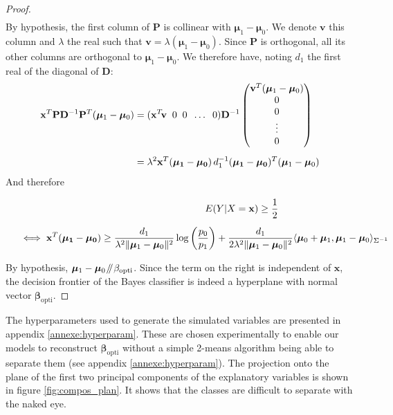 \documentclass[preprint,12pt]{elsarticle}
\newcommand{\parallelsum}{\mathbin{\!/\mkern-5mu/\!}}
\begin{document}
\begin{proof}
\begin{align}
\end{align}
By hypothesis, the first column of $\mathbf{P}$ is collinear with $\bm{\mu}_1 - \bm{\mu}_0$. We denote $\mathbf{v}$ this column and $\lambda$ the real such that $\mathbf{v} = \lambda (\bm{\mu}_1 - \bm{\mu}_0)$. Since $\mathbf{P}$ is orthogonal, all its other columns are orthogonal to $\bm{\mu}_1 - \bm{\mu}_0$. We therefore have, noting $d_1$ the first real of the diagonal of $\mathbf{D}$:
\begin{align}
    \mathbf{x}^T\mathbf{P}\mathbf{D}^{-1}\mathbf{P}^T(\bm{\mu}_1 - \bm{\mu}_0) &= (\mathbf{x}^T \hspace{-2 pt}\mathbf{v} \; \; 0 \; \; 0 \; \;\hdots \; \; 0) \mathbf{D}^{-1} \begin{pmatrix}
        \mathbf{v}^T(\bm{\mu}_1 - \bm{\mu}_0) \\
        0 \\
        0 \\
        \vdots \\
        0
        \end{pmatrix}\\[5 pt]
    &= \lambda^2\mathbf{x}^T (\mathbf{\bm{\mu}_1 - \bm{\mu}_0}) \, d_1^{-1} (\mathbf{\bm{\mu}_1 - \bm{\mu}_0})^T(\bm{\mu}_1 - \bm{\mu}_0)
\end{align}
And therefore

\begin{align}
    E(Y|X = \mathbf{x}) \geq \frac{1}{2} \hspace{2 cm} \phantom{2} & \\[5 pt]
    \iff  \mathbf{x}^T (\mathbf{\bm{\mu}_1 - \bm{\mu}_0})  \geq  \frac{d_1}{ \lambda^2\lVert\bm{\mu}_1 - \bm{\mu}_0 \rVert^2}\log\left(\frac{p_0}{p_1} \right) + \frac{d_1}{2 \lambda^2\lVert\bm{\mu}_1 - \bm{\mu}_0 \rVert^2}\langle \bm{\mu}_0 + \bm{\mu}_1 , \bm{\mu}_1 - \bm{\mu}_0\rangle_{\Sigma^{-1}} \hspace{-2 cm} \phantom{2} &\\[5 pt]
\end{align}
By hypothesis, $\bm{\mu}_1 - \bm{\mu}_0 \parallelsum \beta_{\text{opti}}$. Since the term on the right is independent of $\mathbf{x}$, the decision frontier of the Bayes classifier is indeed a hyperplane with normal vector $\bm{\beta}_{\text{opti}}$.
\end{proof}

The hyperparameters used to generate the simulated variables are presented in appendix \ref{annexe:hyperparam}. These are chosen experimentally to enable our models to reconstruct $\bm{\beta}_{\text{opti}}$ without a simple 2-means algorithm being able to separate them (see appendix \ref{annexe:hyperparam}). The projection onto the plane of the first two principal components of the explanatory variables is shown in figure \ref{fig:compos_plan}. It shows that the classes are difficult to separate with the naked eye.
\end{document}
